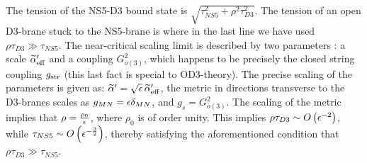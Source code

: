 The tension of the NS5-D3 bound state is $\sqrt{\tau_{NS5}^2 + \rho^2
\tau_{D3}^2}$.  The tension of an open D3-brane stuck to the NS5-brane
is
 where in the last line we have used $\rho\tau_{D3} \gg \tau_{NS5}$.
The near-critical scaling limit is described by two parameters
\cite{GMSS}: a scale $\tilde\alpha'_{\rm eff}$ and a coupling
$G_{o(3)}^2$, which happens to be precisely the closed string coupling
$g_{\rm str}$ (this last fact is special to OD3-theory).  The precise
scaling of the parameters is given as: 
$\tilde\alpha' = \sqrt{\epsilon} \, \tilde\alpha'_{\rm eff}$, the
metric in directions transverse to the D3-branes scales as $g_{MN} =
\e \d_{MN}$, and $g_s = G_{o(3)}^2$.  The scaling of the metric implies
that $\rho = \frac{\rho_0}{\e}$, where $\rho_0$ is of order unity.
This implies $\rho \tau_{D3} \sim O\left( {\e^{-2}} \right)$, while
$\tau_{NS5} \sim O\left( {\e^{-\frac{3}{2}}}\right)$, thereby
satisfying the aforementioned condition that $\rho\tau_{D3} \gg
\tau_{NS5}$.

